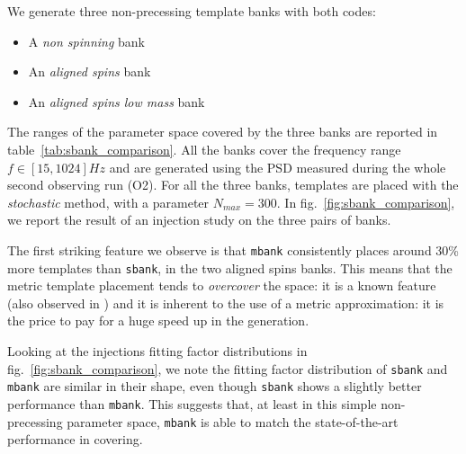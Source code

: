 \documentclass[twocolumn,showpacs,preprintnumbers,nofootinbib,prd,
superscriptaddress,10pt]{revtex4-2}
\begin{document}
We generate three non-precessing template banks with both codes:
\begin{itemize}
	\item A {\it non spinning} bank
	\item An {\it aligned spins} bank
	\item An {\it aligned spins low mass} bank
\end{itemize}
The ranges of the parameter space covered by the three banks are reported in table~\ref{tab:sbank_comparison}. All the banks cover the frequency range $f\in [15,1024] Hz$ and are generated using the PSD measured during the whole second observing run (O2).
For all the three banks, templates are placed with the {\it stochastic} method, with a parameter $N_{max}=300$. In fig.~\ref{fig:sbank_comparison}, we report the result of an injection study on the three pairs of banks.

The first striking feature we observe is that \texttt{mbank} consistently places around 30\% more templates than \texttt{sbank}, in the two aligned spins banks. This means that the metric template placement tends to \textit{overcover} the space: it is a known feature (also observed in \cite{Coogan:2022qxs}) and it is inherent to the use of a metric approximation: it is the price to pay for a huge speed up in the generation.

Looking at the injections fitting factor distributions in fig.~\ref{fig:sbank_comparison}, we note the fitting factor distribution of \texttt{sbank} and \texttt{mbank} are similar in their shape, even though \texttt{sbank} shows a slightly better performance than \texttt{mbank}. This suggests that, at least in this simple non-precessing parameter space, \texttt{mbank} is able to match the state-of-the-art performance in covering.


\end{document}
